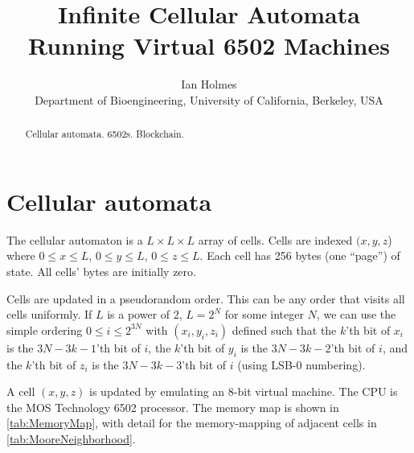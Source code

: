 \documentclass{article}
\begin{document}
\title{Infinite Cellular Automata Running Virtual 6502 Machines}
\author{Ian Holmes \\ Department of Bioengineering, University of California, Berkeley, USA}

\maketitle


\begin{abstract}
  Cellular automata.
  6502s.
  Blockchain.
\end{abstract}

\section{Cellular automata}

The cellular automaton is a $L \times L \times L$ array of cells.
Cells are indexed $(x,y,z$) where $0 \leq x \leq L$, $0 \leq y \leq L$, $0 \leq z \leq L$.
Each cell has 256 bytes (one ``page'') of state.
All cells' bytes are initially zero.

Cells are updated in a pseudorandom order.
This can be any order that visits all cells uniformly.
If $L$ is a power of 2, $L = 2^N$ for some integer $N$,
we can use the simple ordering $0 \leq i \leq 2^{3N}$
with $(x_i,y_i,z_i)$ defined such that
the $k$'th bit of $x_i$ is the $3N-3k-1$'th bit of $i$,
the $k$'th bit of $y_i$ is the $3N-3k-2$'th bit of $i$, and
the $k$'th bit of $z_i$ is the $3N-3k-3$'th bit of $i$
(using LSB-0 numbering).

A cell $(x,y,z)$ is updated by emulating an 8-bit virtual machine.
The CPU is the MOS Technology 6502 processor.
The memory map is shown in \ref{tab:MemoryMap},
with detail for the memory-mapping of adjacent cells in \ref{tab:MooreNeighborhood}.
\end{document}
